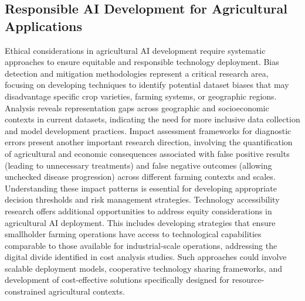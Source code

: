 \documentclass[sn-mathphys]{sn-jnl}
\theoremstyle{thmstyleone}%
\theoremstyle{thmstyletwo}%
\theoremstyle{thmstylethree}%
\begin{document}
\subsection{Responsible AI Development for Agricultural Applications}
Ethical considerations in agricultural AI development require systematic approaches to ensure equitable and responsible technology deployment. Bias detection and mitigation methodologies represent a critical research area, focusing on developing techniques to identify potential dataset biases that may disadvantage specific crop varieties, farming systems, or geographic regions. Analysis reveals representation gaps across geographic and socioeconomic contexts in current datasets, indicating the need for more inclusive data collection and model development practices. Impact assessment frameworks for diagnostic errors present another important research direction, involving the quantification of agricultural and economic consequences associated with false positive results (leading to unnecessary treatments) and false negative outcomes (allowing unchecked disease progression) across different farming contexts and scales. Understanding these impact patterns is essential for developing appropriate decision thresholds and risk management strategies. Technology accessibility research offers additional opportunities to address equity considerations in agricultural AI deployment. This includes developing strategies that ensure smallholder farming operations have access to technological capabilities comparable to those available for industrial-scale operations, addressing the digital divide identified in cost analysis studies. Such approaches could involve scalable deployment models, cooperative technology sharing frameworks, and development of cost-effective solutions specifically designed for resource-constrained agricultural contexts.



\end{document}
